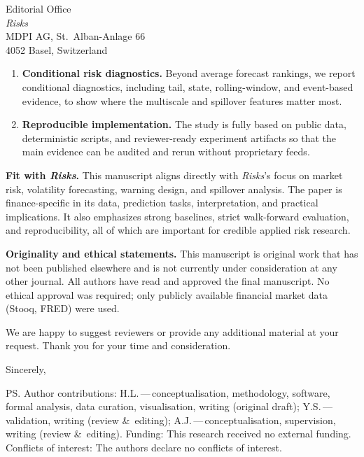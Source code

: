 \documentclass[11pt, a4paper]{letter}
\begin{document}
\begin{letter}{%
  Editorial Office\\
  \textit{Risks}\\
  MDPI AG, St.\ Alban-Anlage 66\\
  4052 Basel, Switzerland
}
\begin{enumerate}
  \item \textbf{Conditional risk diagnostics.}
    Beyond average forecast rankings, we report conditional diagnostics,
    including tail, state, rolling-window, and event-based evidence, to
    show where the multiscale and spillover features matter most.

  \item \textbf{Reproducible implementation.}
    The study is fully based on public data, deterministic scripts, and
    reviewer-ready experiment artifacts so that the main evidence can be
    audited and rerun without proprietary feeds.

\end{enumerate}

\textbf{Fit with \textit{Risks}.}
This manuscript aligns directly with \textit{Risks}'s focus on market risk,
volatility forecasting, warning design, and spillover analysis. The paper is
finance-specific in its data, prediction tasks, interpretation, and
practical implications. It also emphasizes strong baselines, strict
walk-forward evaluation, and reproducibility, all of which are important for
credible applied risk research.

\textbf{Originality and ethical statements.}
This manuscript is original work that has not been published elsewhere and
is not currently under consideration at any other journal.
All authors have read and approved the final manuscript.
No ethical approval was required; only publicly available financial market
data (Stooq, FRED) were used.

We are happy to suggest reviewers or provide any additional material at
your request.
Thank you for your time and consideration.

\closing{Sincerely,}

\ps{Author contributions:
H.L.\,---\,conceptualisation, methodology, software, formal analysis,
  data curation, visualisation, writing (original draft);
Y.S.\,---\,validation, writing (review \&\ editing);
A.J.\,---\,conceptualisation, supervision, writing (review \&\ editing).
Funding: This research received no external funding.
Conflicts of interest: The authors declare no conflicts of interest.}

\end{letter}
\end{document}
